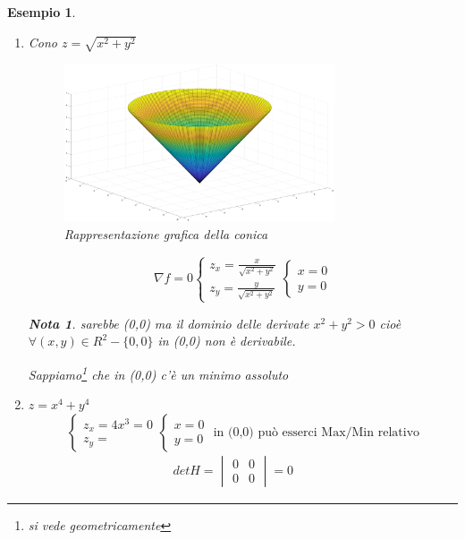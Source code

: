 \documentclass{book}
\newtheorem{nota}{Nota}
\newtheorem{esempio}{Esempio}
\begin{document}
\begin{esempio}
\begin{enumerate}
	  \item Cono $z=\sqrt{x^2+y^2}$ 
		\begin{figure}[ht]
			\centering
			\includegraphics[width=8cm]{img/finiti/cono.eps}
			\caption{Rappresentazione grafica della conica}
			\label{fig:conica}
		\end{figure}
		\begin{equation*}
			\nabla f=0
			\begin{cases}
				z_x=\frac{x}{\sqrt{x^2+y^2}}\\
				z_y=\frac{y}{\sqrt{x^2+y^2}}
			\end{cases}\begin{cases}
					x=0\\
					y=0
			\end{cases} 
		\end{equation*}
		  \begin{nota}
			  sarebbe (0,0) ma il dominio delle derivate $x^2+y^2>0$ cioè
			  $\forall(x,y)\in R^2-\{0,0\}$ in (0,0) non è derivabile.
		  \end{nota}
		  Sappiamo\footnote{si vede geometricamente} che in (0,0) c'è un
		  {\color{red}minimo assoluto}
	  \item $z=x^4 +y^4$
		  \begin{equation*}
			\begin{cases}
				z_x=4x^3=0\\
				z_y=
			\end{cases}\begin{cases}
					x=0\\
					y=0
			\end{cases} \text{ in (0,0) può esserci Max/Min relativo}
		  \end{equation*}
		  \begin{equation*}
			  \begin{matrix}
				det H=\begin{vmatrix}
					0 & 0\\
					0 & 0
				\end{vmatrix} = 0 & \begin{matrix}

\end{matrix}
\end{matrix}
\end{equation*}
\end{enumerate}
\end{esempio}
\end{document}
